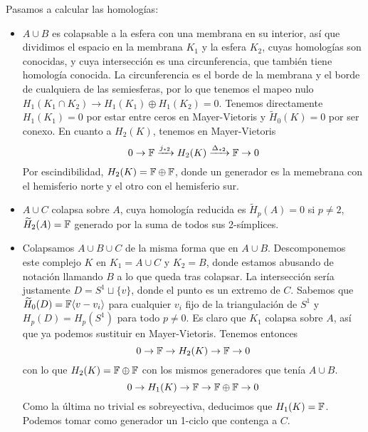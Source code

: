 \documentclass[twoside]{article}
\begin{document}
\begin{solucion}
Pasamos a calcular las homologías:
\begin{itemize}
\item $A\cup B$ es colapsable a la esfera con una membrana en su interior, así que dividimos el espacio en la membrana $K_1$ y la esfera $K_2$, cuyas homologías son conocidas, y cuya intersección es una circunferencia, que también tiene homología conocida. La circunferencia es el borde de la membrana y el borde de cualquiera de las semiesferas, por lo que tenemos el mapeo nulo $H_1(K_1\cap K_2)\to H_1(K_1)\oplus H_1(K_2)=0$. Tenemos directamente $H_1(K_1)=0$ por estar entre ceros en Mayer-Vietoris y $\widetilde{H}_0(K)=0$ por ser conexo. En cuanto a $H_2(K)$, tenemos en Mayer-Vietoris
\[
0\to\mathbb{F}\xrightarrow{j_{*2}}H_2(K)\xrightarrow{\Delta_{*2}}\mathbb{F}\to 0
\]
Por escindibilidad, $H_2(K)=\mathbb{F}\oplus\mathbb{F}$, donde un generador es la memebrana con el hemisferio norte y el otro con el hemisferio sur.

\item $A\cup C$ colapsa sobre $A$, cuya homología reducida es $\widetilde{H}_p(A)=0$ si $p\neq 2$, $\widetilde{H}_2(A)=\mathbb{F}$ generado por la suma de todos sus 2-símplices.

\item Colapsamos $A\cup B\cup C$ de la misma forma que en $A\cup B$. Descomponemos este complejo $K$ en $K_1=A\cup C$ y $K_2=B$, donde estamos abusando de notación llamando $B$ a lo que queda tras colapsar. La intersección  sería justamente $D=S^1\sqcup\{v\}$, donde el punto es un extremo de $C$. Sabemos que $\widetilde{H}_0(D)=\mathbb{F}\langle{v-v_i}\rangle$ para cualquier $v_i$ fijo de la triangulación de $S^1$ y $H_p(D)=H_p(S^1)$ para todo $p\neq 0$. Es claro que $K_1$ colapsa sobre $A$, así que ya podemos sustituir en Mayer-Vietoris. Tenemos entonces
\[
0\to \mathbb{F}\to H_2(K)\to \mathbb{F}\to 0
\]
con lo que $H_2(K)=\mathbb{F}\oplus\mathbb{F}$ con los mismos generadores que tenía $A\cup B$. 
\[
0\to H_1(K)\to\mathbb{F}\to\mathbb{F}\oplus\mathbb{F}\to 0
\]
Como la última no trivial es sobreyectiva, deducimos que $H_1(K)=\mathbb{F}$. Podemos tomar como generador un 1-ciclo que contenga a $C$. 
\end{itemize}
\end{solucion}
\end{document}
